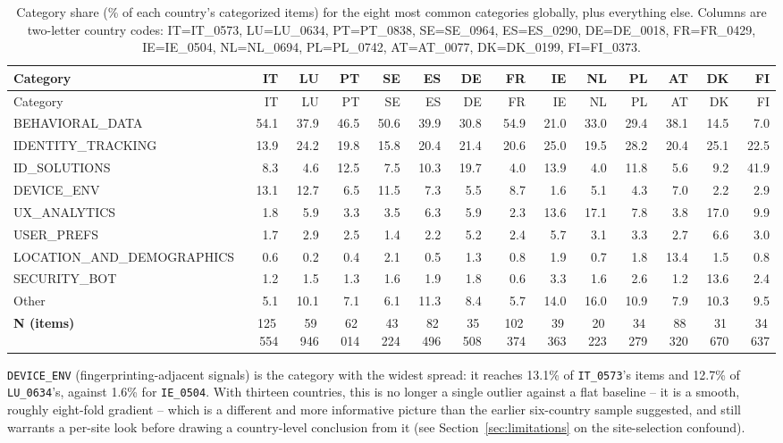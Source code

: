 \documentclass[11pt,a4paper]{article}
\newcommand{\code}[1]{\texttt{#1}}
\begin{document}
\begingroup\tiny\setlength{\tabcolsep}{1.5pt}
\begin{longtable}{lrrrrrrrrrrrrr}
\caption{Category share (\% of each country's categorized items) for the eight most common categories globally, plus everything else. Columns are two-letter country codes: IT=IT\_0573, LU=LU\_0634, PT=PT\_0838, SE=SE\_0964, ES=ES\_0290, DE=DE\_0018, FR=FR\_0429, IE=IE\_0504, NL=NL\_0694, PL=PL\_0742, AT=AT\_0077, DK=DK\_0199, FI=FI\_0373.}\label{tab:categories}\\
\toprule
Category & IT & LU & PT & SE & ES & DE & FR & IE & NL & PL & AT & DK & FI \\
\midrule
\endfirsthead
\toprule
Category & IT & LU & PT & SE & ES & DE & FR & IE & NL & PL & AT & DK & FI \\
\midrule
\endhead
BEHAVIORAL\_DATA & 54.1 & 37.9 & 46.5 & 50.6 & 39.9 & 30.8 & 54.9 & 21.0 & 33.0 & 29.4 & 38.1 & 14.5 & 7.0 \\
IDENTITY\_TRACKING & 13.9 & 24.2 & 19.8 & 15.8 & 20.4 & 21.4 & 20.6 & 25.0 & 19.5 & 28.2 & 20.4 & 25.1 & 22.5 \\
ID\_SOLUTIONS & 8.3 & 4.6 & 12.5 & 7.5 & 10.3 & 19.7 & 4.0 & 13.9 & 4.0 & 11.8 & 5.6 & 9.2 & 41.9 \\
DEVICE\_ENV & 13.1 & 12.7 & 6.5 & 11.5 & 7.3 & 5.5 & 8.7 & 1.6 & 5.1 & 4.3 & 7.0 & 2.2 & 2.9 \\
UX\_ANALYTICS & 1.8 & 5.9 & 3.3 & 3.5 & 6.3 & 5.9 & 2.3 & 13.6 & 17.1 & 7.8 & 3.8 & 17.0 & 9.9 \\
USER\_PREFS & 1.7 & 2.9 & 2.5 & 1.4 & 2.2 & 5.2 & 2.4 & 5.7 & 3.1 & 3.3 & 2.7 & 6.6 & 3.0 \\
LOCATION\_AND\_DEMOGRAPHICS & 0.6 & 0.2 & 0.4 & 2.1 & 0.5 & 1.3 & 0.8 & 1.9 & 0.7 & 1.8 & 13.4 & 1.5 & 0.8 \\
SECURITY\_BOT & 1.2 & 1.5 & 1.3 & 1.6 & 1.9 & 1.8 & 0.6 & 3.3 & 1.6 & 2.6 & 1.2 & 13.6 & 2.4 \\
Other & 5.1 & 10.1 & 7.1 & 6.1 & 11.3 & 8.4 & 5.7 & 14.0 & 16.0 & 10.9 & 7.9 & 10.3 & 9.5 \\
\midrule
\textbf{N (items)} & 125\,554 & 59\,946 & 62\,014 & 43\,224 & 82\,496 & 35\,508 & 102\,374 & 39\,363 & 20\,223 & 34\,279 & 88\,320 & 31\,670 & 34\,637 \\
\bottomrule
\end{longtable}
\endgroup

\code{DEVICE\_ENV} (fingerprinting-adjacent signals) is the category with the
widest spread: it reaches 13.1\% of \code{IT\_0573}'s items and
12.7\% of \code{LU\_0634}'s, against 1.6\% for
\code{IE\_0504}. With thirteen countries, this is no longer a single
outlier against a flat baseline -- it is a smooth, roughly eight-fold
gradient -- which is a different and more informative picture than the earlier
six-country sample suggested, and still warrants a per-site look before
drawing a country-level conclusion from it (see
Section~\ref{sec:limitations} on the site-selection confound).
\end{document}
